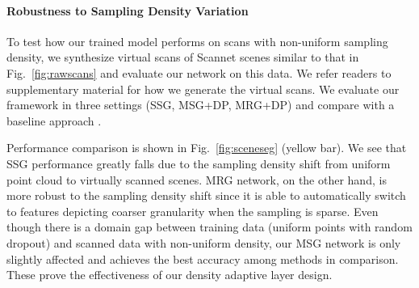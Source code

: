 \vspace{-0.3cm}
\paragraph{Robustness to Sampling Density Variation}
To test how our trained model performs on scans with non-uniform sampling density, we synthesize virtual scans of Scannet scenes similar to that in Fig.~\ref{fig:rawscans} and evaluate our network on this data. We refer readers to supplementary material for how we generate the virtual scans.
We evaluate our framework in three settings (SSG, MSG+DP, MRG+DP) and compare with a baseline approach \cite{qi2016pointnet}.

Performance comparison is shown in Fig.~\ref{fig:sceneseg} (yellow bar). We see that SSG performance greatly falls due to the sampling density shift from uniform point cloud to virtually scanned scenes. MRG network, on the other hand, is more robust to the sampling density shift since it is able to automatically switch to features depicting coarser granularity when the sampling is sparse. Even though there is a domain gap between training data (uniform points with random dropout) and scanned data with non-uniform density, our MSG network is only slightly affected and achieves the best accuracy among methods in comparison. These prove the effectiveness of our density adaptive layer design.

